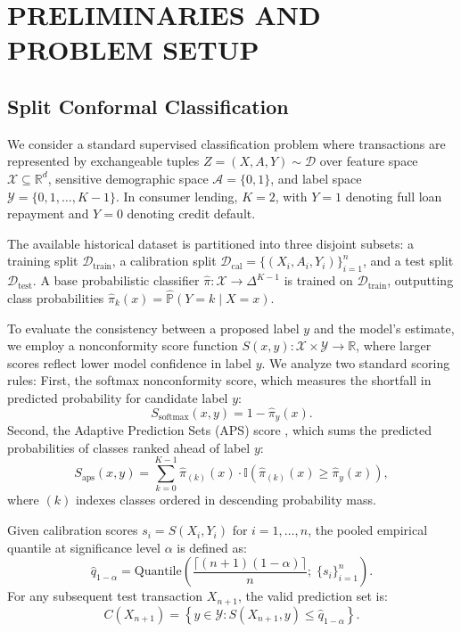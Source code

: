 \documentclass[twoside]{article}
\begin{document}
\section{PRELIMINARIES AND PROBLEM SETUP}

\subsection{Split Conformal Classification}
We consider a standard supervised classification problem where transactions are represented by exchangeable tuples $Z = (X, A, Y) \sim \mathcal{D}$ over feature space $\mathcal{X} \subseteq \mathbb{R}^d$, sensitive demographic space $\mathcal{A} = \{0, 1\}$, and label space $\mathcal{Y} = \{0, 1, \dots, K-1\}$. In consumer lending, $K = 2$, with $Y=1$ denoting full loan repayment and $Y=0$ denoting credit default.

The available historical dataset is partitioned into three disjoint subsets: a training split $\mathcal{D}_{\text{train}}$, a calibration split $\mathcal{D}_{\text{cal}} = \{(X_i, A_i, Y_i)\}_{i=1}^n$, and a test split $\mathcal{D}_{\text{test}}$. A base probabilistic classifier $\hat{\pi}: \mathcal{X} \to \Delta^{K-1}$ is trained on $\mathcal{D}_{\text{train}}$, outputting class probabilities $\hat{\pi}_k(x) = \hat{\mathbb{P}}(Y = k \mid X = x)$.

To evaluate the consistency between a proposed label $y$ and the model's estimate, we employ a nonconformity score function $S(x, y): \mathcal{X} \times \mathcal{Y} \to \mathbb{R}$, where larger scores reflect lower model confidence in label $y$. We analyze two standard scoring rules:
First, the softmax nonconformity score, which measures the shortfall in predicted probability for candidate label $y$:
\begin{equation}
S_{\text{softmax}}(x, y) = 1 - \hat{\pi}_y(x).
\end{equation}
Second, the Adaptive Prediction Sets (APS) score \citep{romano2020classification}, which sums the predicted probabilities of classes ranked ahead of label $y$:
\begin{equation}
S_{\text{aps}}(x, y) = \sum_{k=0}^{K-1} \hat{\pi}_{(k)}(x) \cdot \mathbb{I}\left( \hat{\pi}_{(k)}(x) \ge \hat{\pi}_y(x) \right),
\end{equation}
where $(k)$ indexes classes ordered in descending probability mass.

Given calibration scores $s_i = S(X_i, Y_i)$ for $i=1, \dots, n$, the pooled empirical quantile at significance level $\alpha$ is defined as:
\begin{equation}
\label{eq:quantile_def}
\hat{q}_{1-\alpha} = \text{Quantile}\left( \frac{\lceil (n+1)(1-\alpha) \rceil}{n};\; \{s_i\}_{i=1}^n \right).
\end{equation}
For any subsequent test transaction $X_{n+1}$, the valid prediction set is:
\begin{equation}
C(X_{n+1}) = \left\{ y \in \mathcal{Y} : S(X_{n+1}, y) \le \hat{q}_{1-\alpha} \right\}.
\end{equation}
\end{document}
